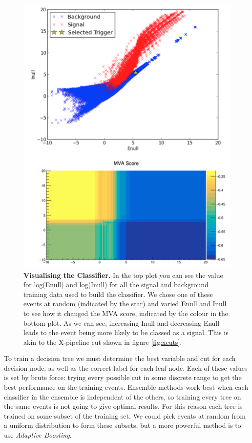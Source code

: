 \documentclass[11pt]{cuthesis}
\newcommand{\xp}{X-pipeline }
\begin{document}
\begin{figure} %
\begin{center}
\includegraphics[width=0.8\linewidth]{mva_trigger_and_score2.png}
\end{center}
\caption{\textbf{Visualising the Classifier.} In the top plot you can see the value for log(Enull) and log(Inull) for all the signal and background training data used to build the classifier. We chose one of these events at random (indicated by the star) and varied Enull and Inull to see how it changed the MVA score, indicated by the colour in the bottom plot. As we can see, increasing Inull and decreasing Enull leads to the event being more likely to be classed as a signal. This is akin to the \xp cut shown in figure \ref{fig:xcuts}. }
\label{fig:mvacuts}
\end{figure}

To train a decision tree we must determine the best variable and cut for each decision node, as well as the correct label for each leaf node. Each of these values is set by brute force: trying every possible cut in some discrete range to get the best performance on the training events. Ensemble methods work best when each classifier in the ensemble is independent of the others, so training every tree on the same events is not going to give optimal results. For this reason each tree is trained on some subset of the training set. We could pick events at random from a uniform distribution to form these subsets, but a more powerful method is to use \textit{Adaptive Boosting}. 
\end{document}
